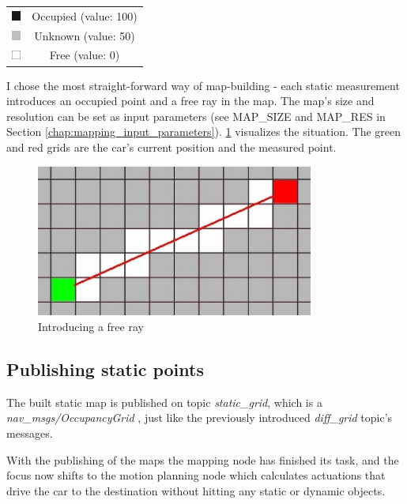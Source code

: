\begin{center}
    \begin{tabular}{ c c }
        \includegraphics[height=3mm]{figures/raw/jpeg/map_occupied.jpg} & Occupied (value: 100) \\
        \includegraphics[height=3mm]{figures/raw/jpeg/map_unknown.jpg}  & Unknown (value: 50)   \\
        \includegraphics[height=3mm]{figures/raw/jpeg/map_free.jpg}     & Free (value: 0)       \\
    \end{tabular}
\end{center}

I chose the most straight-forward way of map-building - each static measurement introduces an occupied point and a free ray in the map. The map's size and resolution can be set as input parameters (see MAP\_SIZE and MAP\_RES in Section \ref{chap:mapping_input_parameters}). \ref{map_ray} visualizes the situation. The green and red grids are the car's current position and the measured point.

\begin{figure}[!ht]
    \centering
    \includegraphics[height=50mm]{figures/raw/jpeg/map_ray.jpg}
    \caption{Introducing a free ray}
    \label{map_ray}
\end{figure}

\subsection{Publishing static points}
\label{chap:publishing_static_points}
The built static map is published on topic \textit{static\_grid}, which is a \textit{nav\_msgs/OccupancyGrid} \cite{ros_msg_OccupancyGrid}, just like the previously introduced \textit{diff\_grid} topic's messages.

With the publishing of the maps the mapping node has finished its task, and the focus now shifts to the motion planning node which calculates actuations that drive the car to the destination without hitting any static or dynamic objects.